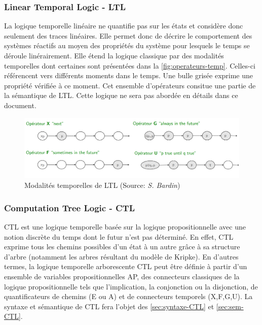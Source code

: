 \documentclass[runningheads,a4paper,10pt]{llncs}
\begin{document}
\subsubsection{Linear Temporal Logic - LTL}
La logique temporelle linéaire ne quantifie pas sur les états et considère donc seulement des traces linéaires. Elle permet donc de décrire le comportement des systèmes réactifs au moyen des propriétés du système pour lesquels le temps se déroule linérairement. Elle étend la logique classique par des modalités temporelles dont certaines sont présentées dans la \autoref{fig:operateurs-temp}. Celles-ci référencent vers différents moments dans le temps. Une bulle grisée exprime une propriété vérifiée à ce moment. Cet ensemble d'opérateurs consitue une partie de la sémantique de LTL. Cette logique ne sera pas abordée en détails dans ce document.

\begin{figure}
  \centering
   \includegraphics[scale=0.43]{figures/operateurs-temp.png}
   \caption[Caption for LOF]{Modalités temporelles de LTL (Source: \textit{S. Bardin})\protect\footnotemark}
   \label{fig:operateurs-temp}
\end{figure}


\subsubsection{Computation Tree Logic - CTL}
CTL est une logique temporelle basée sur la logique propositionnelle avec une notion discrète du temps dont le futur n'est pas déterminé. En effet, CTL exprime tous les chemins possibles d'un état à un autre grâce à sa structure d'arbre (notamment les arbres résultant du modèle de Kripke). En d'autres termes, la logique temporelle arborescente CTL peut être définie à partir d’un ensemble de variables propositionnelles AP, des connecteurs classiques de la logique propositionnelle tels que l'implication, la conjonction ou la disjonction, de quantificateurs de chemins (E ou A) et de connecteurs temporels (X,F,G,U). La syntaxe et sémantique de CTL fera l'objet des \autoref{sec:syntaxe-CTL} et \autoref{sec:sem-CTL}. \\
\end{document}
